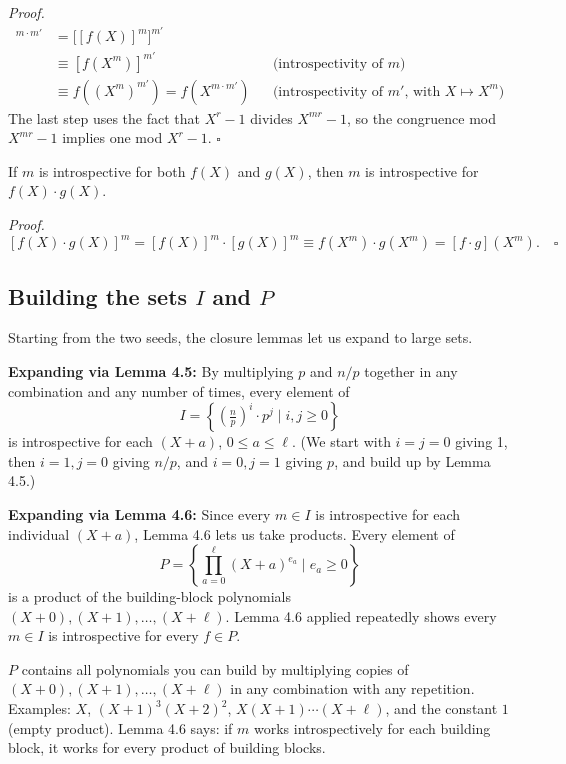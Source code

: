 \documentclass[12pt]{article}
\begin{document}
\textit{Proof.}
\begin{align*}
  [f(X)]^{m\cdot m'} &= \bigl[[f(X)]^m\bigr]^{m'} \\
  &\equiv [f(X^m)]^{m'} && \text{(introspectivity of $m$)}\\
  &\equiv f((X^m)^{m'}) = f(X^{m\cdot m'}) && \text{(introspectivity of $m'$, with $X\mapsto X^m$)}
\end{align*}
The last step uses the fact that $X^r-1$ divides $X^{mr}-1$, so the congruence mod $X^{mr}-1$ implies one mod $X^r-1$. $\square$

\begin{thmbox}
If $m$ is introspective for both $f(X)$ and $g(X)$, then $m$ is introspective for $f(X)\cdot g(X)$.
\end{thmbox}

\textit{Proof.}
\[
  [f(X)\cdot g(X)]^m = [f(X)]^m\cdot[g(X)]^m \equiv f(X^m)\cdot g(X^m) = [f\cdot g](X^m). \quad\square
\]

\subsection{Building the sets $I$ and $P$}

Starting from the two seeds, the closure lemmas let us expand to large sets.

\textbf{Expanding via Lemma 4.5:} By multiplying $p$ and $n/p$ together in any combination and any number of times, every element of
\[
  I = \left\{\left(\tfrac{n}{p}\right)^i \cdot p^j \;\Big|\; i,j\geq 0\right\}
\]
is introspective for each $(X+a)$, $0\leq a\leq\ell$. (We start with $i=j=0$ giving 1, then $i=1,j=0$ giving $n/p$, and $i=0,j=1$ giving $p$, and build up by Lemma 4.5.)

\textbf{Expanding via Lemma 4.6:} Since every $m\in I$ is introspective for each individual $(X+a)$, Lemma 4.6 lets us take products. Every element of
\[
  P = \left\{\prod_{a=0}^{\ell}(X+a)^{e_a}\;\Big|\; e_a\geq 0\right\}
\]
is a product of the building-block polynomials $(X+0),(X+1),\ldots,(X+\ell)$. Lemma 4.6 applied repeatedly shows every $m\in I$ is introspective for every $f\in P$.

\begin{intubox}
$P$ contains all polynomials you can build by multiplying copies of $(X+0),(X+1),\ldots,(X+\ell)$ in any combination with any repetition. Examples: $X$, $(X+1)^3(X+2)^2$, $X(X+1)\cdots(X+\ell)$, and the constant $1$ (empty product). Lemma 4.6 says: if $m$ works introspectively for each building block, it works for every product of building blocks.
\end{intubox}
\end{document}
